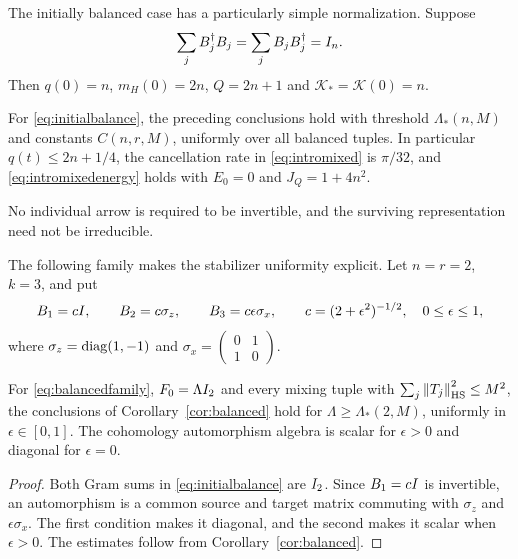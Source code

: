 The initially balanced case has a particularly simple normalization.
Suppose
\begin{equation}\label{eq:initialbalance}
 \sum_jB_j^\dagger B_j=\sum_jB_jB_j^\dagger=I_n.
\end{equation}
Then $q(0)=n$, $m_H(0)=2n$, $Q=2n+1$ and
$\mathcal K_* =\mathcal K(0)=n$.

\begin{corollary}\label{cor:balanced}
For \eqref{eq:initialbalance}, the preceding conclusions hold with
threshold $\Lambda_*(n,M)$ and constants $C(n,r,M)$, uniformly over
all balanced tuples. In particular $q(t)\leq2n+1/4$, the cancellation
rate in \eqref{eq:intromixed} is $\pi/32$, and
\eqref{eq:intromixedenergy} holds with $E_0=0$ and $J_Q=1+4n^2$.
\end{corollary}

No individual arrow is required to be invertible, and the surviving
representation need not be irreducible.

The following family makes the stabilizer uniformity explicit. Let
$n=r=2$, $k=3$, and put
\begin{equation}\label{eq:balancedfamily}
 B_1=cI,\qquad B_2=c\sigma_z,\qquad B_3=c\epsilon\sigma_x,\qquad
 c=(2+\epsilon^2)^{-1/2},\quad 0\leq\epsilon\leq1,
\end{equation}
where
$\sigma_z=\operatorname{diag}(1,-1)$ and
$\sigma_x=\left(\begin{smallmatrix}0&1\\1&0\end{smallmatrix}\right)$.

\begin{corollary}\label{cor:pauli}
For \eqref{eq:balancedfamily}, $F_0=\Lambda I_2$ and every mixing
tuple with $\sum_j\left\lVert T_j\right\rVert_{\mathrm{HS}}^2\leq M^2$, the conclusions of
Corollary~\ref{cor:balanced} hold for $\Lambda\geq\Lambda_*(2,M)$,
uniformly in $\epsilon\in[0,1]$. The cohomology automorphism algebra
is scalar for $\epsilon>0$ and diagonal for $\epsilon=0$.
\end{corollary}

\begin{proof}
Both Gram sums in \eqref{eq:initialbalance} are $I_2$.
Since $B_1=cI$ is invertible, an automorphism is a common source
and target matrix commuting with $\sigma_z$ and $\epsilon\sigma_x$.
The first condition makes it diagonal, and the second makes it scalar
when $\epsilon>0$. The estimates follow from Corollary~\ref{cor:balanced}.
\end{proof}

